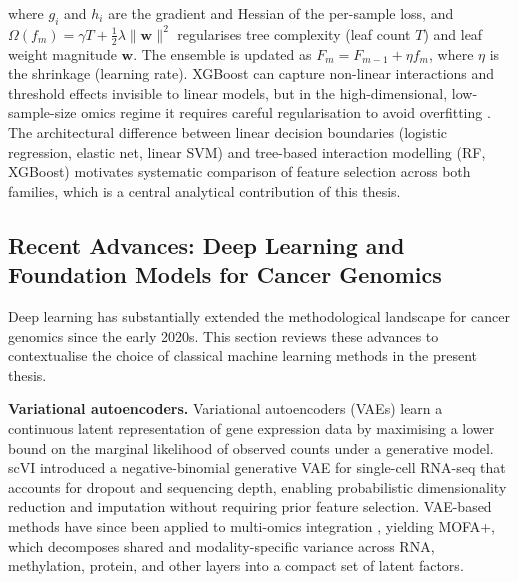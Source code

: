where $g_i$ and $h_i$ are the gradient and Hessian of the per-sample loss, and $\Omega(f_m) = \gamma T + \tfrac{1}{2}\lambda\|\mathbf{w}\|^2$ regularises tree complexity (leaf count $T$) and leaf weight magnitude $\mathbf{w}$. The ensemble is updated as $F_m = F_{m-1} + \eta f_m$, where $\eta$ is the shrinkage (learning rate). XGBoost can capture non-linear interactions and threshold effects invisible to linear models, but in the high-dimensional, low-sample-size omics regime it requires careful regularisation to avoid overfitting \parencite{Chen2016, Vabalas2019}. The architectural difference between linear decision boundaries (logistic regression, elastic net, linear SVM) and tree-based interaction modelling (RF, XGBoost) motivates systematic comparison of feature selection across both families, which is a
central analytical contribution of this thesis.

\subsection{Recent Advances: Deep Learning and Foundation Models
            for Cancer Genomics}
 
Deep learning has substantially extended the methodological landscape for cancer genomics since the early 2020s. This section reviews these advances to contextualise the choice of classical machine learning methods in the present thesis.
 
\textbf{Variational autoencoders.}
Variational autoencoders (VAEs) learn a continuous latent representation of gene expression data by maximising a lower bound on the marginal likelihood of observed counts under a generative model. scVI \parencite{Lopez2018} introduced a negative-binomial generative VAE for single-cell RNA-seq that accounts for dropout and sequencing depth, enabling probabilistic dimensionality reduction and imputation without requiring prior feature selection. VAE-based methods have since been applied to multi-omics integration \parencite{Argelaguet2020}, yielding MOFA+, which decomposes shared and modality-specific variance across RNA, methylation, protein, and other layers into a compact set of latent factors.
 
